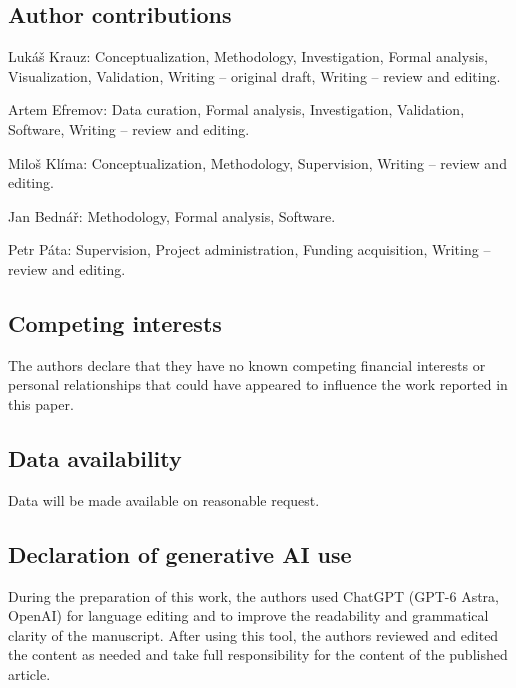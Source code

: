\documentclass[pdflatex,sn-apa]{sn-jnl}
\begin{document}
\subsection*{Author contributions}

Luk\'a\v{s} Krauz: Conceptualization, Methodology, Investigation, Formal analysis, Visualization, Validation, Writing -- original draft, Writing -- review and editing. 

\noindent
Artem Efremov: Data curation, Formal analysis, Investigation, Validation, Software, Writing -- review and editing. 

\noindent
Milo\v{s} Kl\'ima: Conceptualization, Methodology, Supervision, Writing -- review and editing.

\noindent
Jan Bedn\'a\v{r}: Methodology, Formal analysis, Software.

\noindent
Petr P\'ata: Supervision, Project administration, Funding acquisition, Writing -- review and editing.

\subsection*{Competing interests}
The authors declare that they have no known competing financial interests or personal relationships that could have appeared to influence the work reported in this paper.

\subsection*{Data availability}
Data will be made available on reasonable request.

\subsection*{Declaration of generative AI use}
During the preparation of this work, the authors used ChatGPT (GPT-6 Astra, OpenAI) for language editing and to improve the readability and grammatical clarity of the manuscript. After using this tool, the authors reviewed and edited the content as needed and take full responsibility for the content of the published article.





\end{document}

